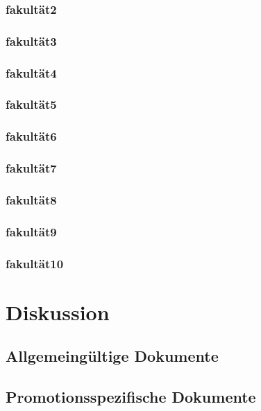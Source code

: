 \subsubsection{\gls{fakultät2}}
\subsubsection{\gls{fakultät3}}
\subsubsection{\gls{fakultät4}}
\subsubsection{\gls{fakultät5}}
\subsubsection{\gls{fakultät6}}
\subsubsection{\gls{fakultät7}}
\subsubsection{\gls{fakultät8}}
\subsubsection{\gls{fakultät9}}
\subsubsection{\gls{fakultät10}}

\section{Diskussion}\label{sec:luh-repo-discussion}
\subsection{Allgemeingültige Dokumente}\label{sec:luh-repo-discussion-general}
\subsection{Promotionsspezifische Dokumente}\label{sec:luh-repo-discussion-specific}

